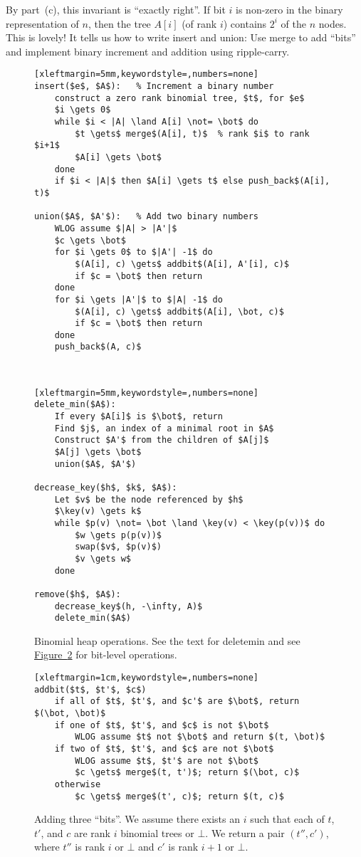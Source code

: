 \documentclass[a4paper]{article}
\DeclareMathOperator{\key}{key}
\newcommand{\any}{{\rule[-.2ex]{1ex}{.4pt}}}	%
\newcommand*{\figref}[1]{\hyperref[#1]{Figure~\ref*{#1}}}
\begin{document}
By part~(c), this invariant is ``exactly right''.
If bit $i$ is non-zero in the binary representation of $n$, then the tree $A[i]$ (of rank $i$) contains $2^i$ of the $n$ nodes.
This is lovely!
It tells us how to write insert and union:
Use merge to add ``bits'' and implement binary increment and addition using ripple-carry.

\begin{figure}
\begin{minipage}{0.49\textwidth}
\begin{lstlisting}[xleftmargin=5mm,keywordstyle=,numbers=none]
insert($e$, $A$):	% Increment a binary number
	construct a zero rank binomial tree, $t$, for $e$
	$i \gets 0$
	while $i < |A| \land A[i] \not= \bot$ do
		$t \gets$ merge$(A[i], t)$	% rank $i$ to rank $i+1$
		$A[i] \gets \bot$
	done
	if $i < |A|$ then $A[i] \gets t$ else push_back$(A[i], t)$

union($A$, $A'$):	% Add two binary numbers
	WLOG assume $|A| > |A'|$
	$c \gets \bot$
	for $i \gets 0$ to $|A'| -1$ do
		$(A[i], c) \gets$ addbit$(A[i], A'[i], c)$
		if $c = \bot$ then return
	done
	for $i \gets |A'|$ to $|A| -1$ do
		$(A[i], c) \gets$ addbit$(A[i], \bot, c)$
		if $c = \bot$ then return
	done
	push_back$(A, c)$
\end{lstlisting}
\end{minipage}
~~\vrule~~
\begin{minipage}{0.49\textwidth}
\begin{lstlisting}[xleftmargin=5mm,keywordstyle=,numbers=none]
delete_min($A$):
	If every $A[i]$ is $\bot$, return
	Find $j$, an index of a minimal root in $A$
	Construct $A'$ from the children of $A[j]$
	$A[j] \gets \bot$
	union($A$, $A'$)

decrease_key($h$, $k$, $A$):
	Let $v$ be the node referenced by $h$
	$\key(v) \gets k$
	while $p(v) \not= \bot \land \key(v) < \key(p(v))$ do
		$w \gets p(p(v))$
		swap($v$, $p(v)$)
		$v \gets w$
	done

remove($h$, $A$):
	decrease_key$(h, -\infty, A)$
	delete_min($A$)
\end{lstlisting}
\end{minipage}
\caption{%
	Binomial heap operations.
	See the text for delete\protect\any{}min and see \figref{fig:binheapbit} for bit-level operations.
}
\label{fig:binheap}
\end{figure}

\begin{figure}
\begin{lstlisting}[xleftmargin=1cm,keywordstyle=,numbers=none]
addbit($t$, $t'$, $c$)
	if all of $t$, $t'$, and $c'$ are $\bot$, return $(\bot, \bot)$
	if one of $t$, $t'$, and $c$ is not $\bot$
		WLOG assume $t$ not $\bot$ and return $(t, \bot)$
	if two of $t$, $t'$, and $c$ are not $\bot$
		WLOG assume $t$, $t'$ are not $\bot$
		$c \gets$ merge$(t, t')$; return $(\bot, c)$
	otherwise
		$c \gets$ merge$(t', c)$; return $(t, c)$
\end{lstlisting}
\caption{%
	Adding three ``bits''.
	We assume there exists an $i$ such that each of $t$, $t'$, and $c$ are rank $i$ binomial trees or $\bot$.
	We return a pair $(t'', c')$, where $t''$ is rank $i$ or $\bot$ and $c'$ is rank $i+1$ or $\bot$.
}
\label{fig:binheapbit}
\end{figure}
\end{document}
